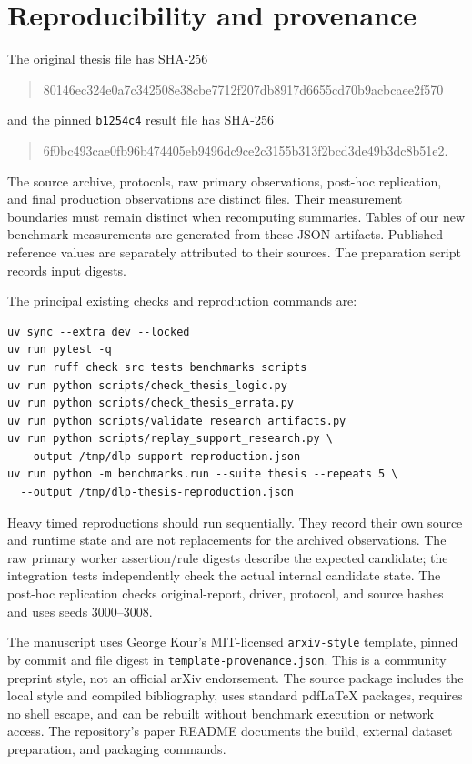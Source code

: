 \documentclass{article}
\newcommand{\code}[1]{\texttt{#1}}
\begin{document}
\appendix
\section{Reproducibility and provenance}
\label{app:repro}
The original thesis file has SHA-256
\begin{quote}\small\ttfamily
80146ec324e0a7c342508e38cbe7712f207db8917d6655cd70b9acbcaee2f570
\end{quote}
and the pinned \code{b1254c4} result file has SHA-256
\begin{quote}\small\ttfamily
6f0bc493cae0fb96b474405eb9496dc9ce2c3155b313f2bcd3de49b3dc8b51e2.
\end{quote}
The source archive, protocols, raw primary observations, post-hoc replication,
and final production observations are distinct files. Their measurement
boundaries must remain distinct when recomputing summaries. Tables of our new
benchmark measurements are generated from these JSON artifacts. Published
reference values are separately attributed to their sources. The preparation
script records input digests.

The principal existing checks and reproduction commands are:
\begin{verbatim}
uv sync --extra dev --locked
uv run pytest -q
uv run ruff check src tests benchmarks scripts
uv run python scripts/check_thesis_logic.py
uv run python scripts/check_thesis_errata.py
uv run python scripts/validate_research_artifacts.py
uv run python scripts/replay_support_research.py \
  --output /tmp/dlp-support-reproduction.json
uv run python -m benchmarks.run --suite thesis --repeats 5 \
  --output /tmp/dlp-thesis-reproduction.json
\end{verbatim}
Heavy timed reproductions should run sequentially. They record their own source
and runtime state and are not replacements for the archived observations.
The raw primary worker assertion/rule digests describe the expected candidate;
the integration tests independently check the actual internal candidate state.
The post-hoc replication checks original-report, driver, protocol, and source
hashes and uses seeds 3000--3008.

The manuscript uses George Kour's MIT-licensed \code{arxiv-style} template,
pinned by commit and file digest in \code{template-provenance.json}. This is a
community preprint style, not an official arXiv endorsement. The source package
includes the local style and compiled bibliography, uses standard pdfLaTeX
packages, requires no shell escape, and can be rebuilt without benchmark
execution or network access. The repository's paper README documents the
build, external dataset preparation, and packaging commands.

\setlength{\bibsep}{1pt}
\renewcommand{\bibfont}{\small\raggedright}


\end{document}

